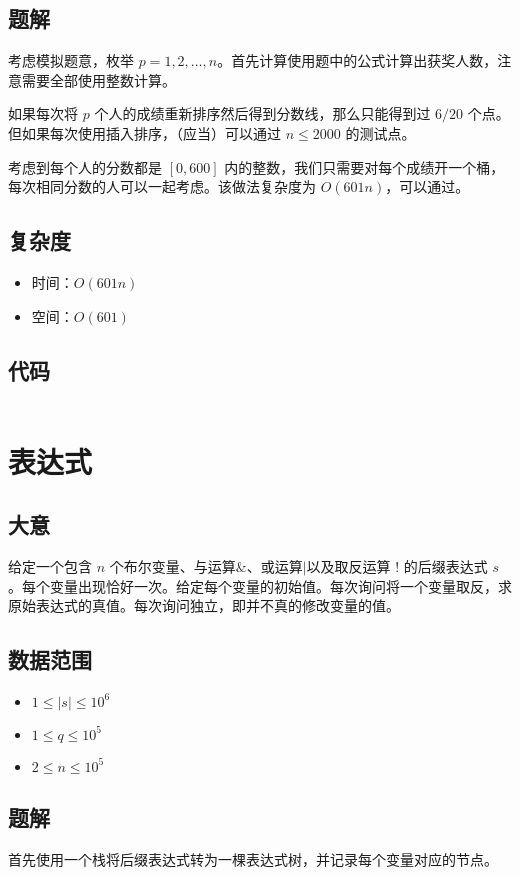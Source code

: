 \documentclass{article}
\begin{document}
\subsection*{题解}
考虑模拟题意，枚举 $p = 1,2,\ldots,n$。首先计算使用题中的公式计算出获奖人数，注意需要全部使用整数计算。

如果每次将 $p$ 个人的成绩重新排序然后得到分数线，那么只能得到过 $6/20$ 个点。但如果每次使用插入排序，（应当）可以通过 $n \le 2000$ 的测试点。

考虑到每个人的分数都是 $[0,600]$ 内的整数，我们只需要对每个成绩开一个桶，每次相同分数的人可以一起考虑。该做法复杂度为 $O(601n)$，可以通过。

\subsection*{复杂度}
\begin{itemize}
\item 时间：$O(601n)$
\item 空间：$O(601)$
\end{itemize}
\subsection*{代码}
\inputminted[linenos,autogobble]{cpp}{T2.cpp}

\section{表达式}
\subsection*{大意}
给定一个包含 $n$ 个布尔变量、与运算$\&$、或运算$|$以及取反运算 $!$ 的后缀表达式 $s$。每个变量出现恰好一次。给定每个变量的初始值。每次询问将一个变量取反，求原始表达式的真值。每次询问独立，即并不真的修改变量的值。

\subsection*{数据范围}
\begin{itemize}
\item $1\le |s| \le 10^6$
\item $1\le q\le 10^5 $
\item $2\le n \le 10^5$
\end{itemize}
\subsection*{题解}
首先使用一个栈将后缀表达式转为一棵表达式树，并记录每个变量对应的节点。
\end{document}
